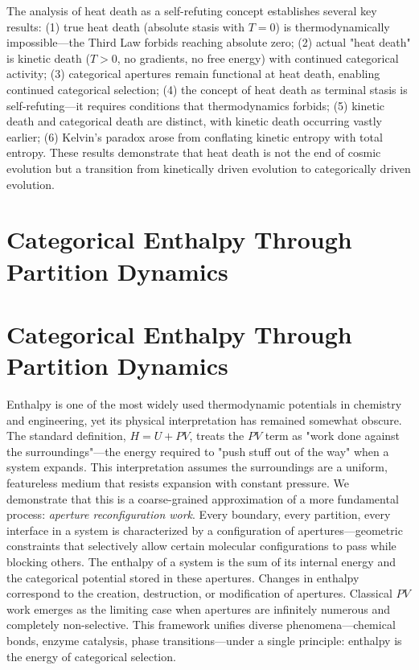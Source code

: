 \documentclass[12pt,a4paper]{article}
\theoremstyle{definition}
\theoremstyle{remark}
\begin{document}
The analysis of heat death as a self-refuting concept establishes several key results: (1) true heat death (absolute stasis with $T = 0$) is thermodynamically impossible—the Third Law forbids reaching absolute zero; (2) actual "heat death" is kinetic death ($T > 0$, no gradients, no free energy) with continued categorical activity; (3) categorical apertures remain functional at heat death, enabling continued categorical selection; (4) the concept of heat death as terminal stasis is self-refuting—it requires conditions that thermodynamics forbids; (5) kinetic death and categorical death are distinct, with kinetic death occurring vastly earlier; (6) Kelvin's paradox arose from conflating kinetic entropy with total entropy. These results demonstrate that heat death is not the end of cosmic evolution but a transition from kinetically driven evolution to categorically driven evolution.



\section{Categorical Enthalpy Through Partition Dynamics}
\label{sec:enthalpy}
\section{Categorical Enthalpy Through Partition Dynamics}
\label{sec:enthalpy}

Enthalpy is one of the most widely used thermodynamic potentials in chemistry and engineering, yet its physical interpretation has remained somewhat obscure. The standard definition, $H = U + PV$, treats the $PV$ term as "work done against the surroundings"—the energy required to "push stuff out of the way" when a system expands. This interpretation assumes the surroundings are a uniform, featureless medium that resists expansion with constant pressure. We demonstrate that this is a coarse-grained approximation of a more fundamental process: \emph{aperture reconfiguration work}. Every boundary, every partition, every interface in a system is characterized by a configuration of apertures—geometric constraints that selectively allow certain molecular configurations to pass while blocking others. The enthalpy of a system is the sum of its internal energy and the categorical potential stored in these apertures. Changes in enthalpy correspond to the creation, destruction, or modification of apertures. Classical $PV$ work emerges as the limiting case when apertures are infinitely numerous and completely non-selective. This framework unifies diverse phenomena—chemical bonds, enzyme catalysis, phase transitions—under a single principle: enthalpy is the energy of categorical selection.
\end{document}
